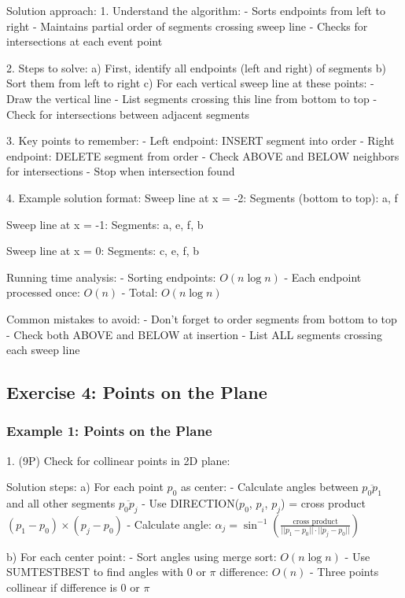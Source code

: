 Solution approach:
1. Understand the algorithm:
   - Sorts endpoints from left to right
   - Maintains partial order of segments crossing sweep line
   - Checks for intersections at each event point

2. Steps to solve:
   a) First, identify all endpoints (left and right) of segments
   b) Sort them from left to right
   c) For each vertical sweep line at these points:
      - Draw the vertical line
      - List segments crossing this line from bottom to top
      - Check for intersections between adjacent segments

3. Key points to remember:
   - Left endpoint: INSERT segment into order
   - Right endpoint: DELETE segment from order
   - Check ABOVE and BELOW neighbors for intersections
   - Stop when intersection found

4. Example solution format:
   Sweep line at x = -2:
   Segments (bottom to top): a, f
   
   Sweep line at x = -1:
   Segments: a, e, f, b
   
   Sweep line at x = 0:
   Segments: c, e, f, b

Running time analysis:
- Sorting endpoints: $O(n \log n)$
- Each endpoint processed once: $O(n)$
- Total: $O(n \log n)$

Common mistakes to avoid:
- Don't forget to order segments from bottom to top
- Check both ABOVE and BELOW at insertion
- List ALL segments crossing each sweep line

\subsection*{Exercise 4: Points on the Plane}

\subsubsection*{Example 1: Points on the Plane}

1. (9P) Check for collinear points in 2D plane:

Solution steps:
a) For each point $p_0$ as center:
   - Calculate angles between $\overline{p_0p_1}$ and all other segments $\overline{p_0p_j}$
   - Use DIRECTION($p_0$, $p_i$, $p_j$) = cross product $(p_1 - p_0) \times (p_j - p_0)$
   - Calculate angle: $\alpha_j = \sin^{-1}(\frac{\text{cross product}}{||p_1-p_0|| \cdot ||p_j-p_0||})$

b) For each center point:
   - Sort angles using merge sort: $O(n \log n)$
   - Use SUMTESTBEST to find angles with 0 or $\pi$ difference: $O(n)$
   - Three points collinear if difference is 0 or $\pi$

